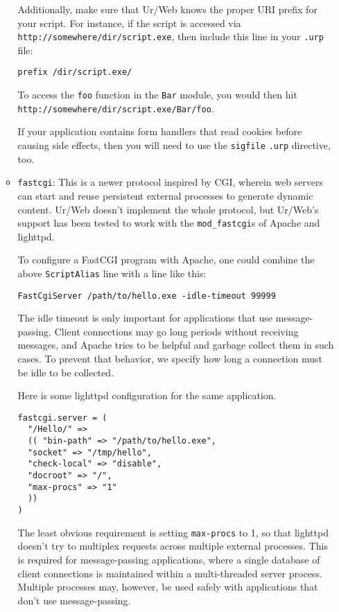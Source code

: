 \documentclass{article}
\begin{document}
\begin{itemize}
\begin{itemize}
    Additionally, make sure that Ur/Web knows the proper URI prefix for your script.  For instance, if the script is accessed via \texttt{http://somewhere/dir/script.exe}, then include this line in your \texttt{.urp} file:
    \begin{verbatim}
prefix /dir/script.exe/
    \end{verbatim}

    To access the \texttt{foo} function in the \texttt{Bar} module, you would then hit \texttt{http://somewhere/dir/script.exe/Bar/foo}.

    If your application contains form handlers that read cookies before causing side effects, then you will need to use the \texttt{sigfile} \texttt{.urp} directive, too.

  \item \texttt{fastcgi}: This is a newer protocol inspired by CGI, wherein web servers can start and reuse persistent external processes to generate dynamic content.  Ur/Web doesn't implement the whole protocol, but Ur/Web's support has been tested to work with the \texttt{mod\_fastcgi}s of Apache and lighttpd.

    To configure a FastCGI program with Apache, one could combine the above \texttt{ScriptAlias} line with a line like this:
    \begin{verbatim}
FastCgiServer /path/to/hello.exe -idle-timeout 99999
    \end{verbatim}
    The idle timeout is only important for applications that use message-passing.  Client connections may go long periods without receiving messages, and Apache tries to be helpful and garbage collect them in such cases.  To prevent that behavior, we specify how long a connection must be idle to be collected.

    Here is some lighttpd configuration for the same application.
    \begin{verbatim}
fastcgi.server = (
  "/Hello/" =>
  (( "bin-path" => "/path/to/hello.exe",
  "socket" => "/tmp/hello",
  "check-local" => "disable",
  "docroot" => "/",
  "max-procs" => "1"
  ))
)
    \end{verbatim}
    The least obvious requirement is setting \texttt{max-procs} to 1, so that lighttpd doesn't try to multiplex requests across multiple external processes.  This is required for message-passing applications, where a single database of client connections is maintained within a multi-threaded server process.  Multiple processes may, however, be used safely with applications that don't use message-passing.


\end{itemize}
\end{itemize}
\end{document}
